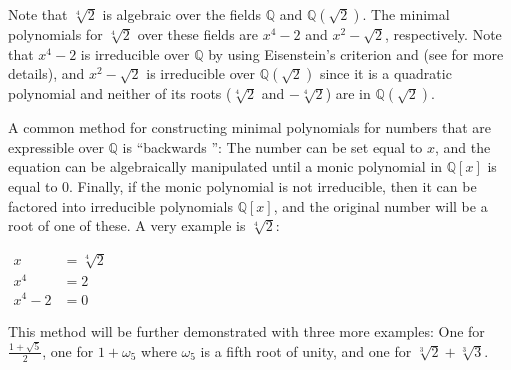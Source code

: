 \documentclass[12pt]{article}
\begin{document}
Note that $\sqrt[4]{2}$ is algebraic over the fields $\mathbb{Q}$ and $\mathbb{Q}(\sqrt{2})$.  The minimal polynomials for $\sqrt[4]{2}$ over these fields are $x^4-2$ and $x^2-\sqrt{2}$, respectively.  Note that $x^4-2$ is irreducible over $\mathbb{Q}$ by using Eisenstein's criterion and  (see  for more details), and $x^2-\sqrt{2}$ is irreducible over $\mathbb{Q}(\sqrt{2})$ since it is a quadratic polynomial and neither of its roots ($\sqrt[4]{2}$ and $-\sqrt[4]{2}$) are in $\mathbb{Q}(\sqrt{2})$.

A common method for constructing minimal polynomials for numbers that are expressible over $\mathbb{Q}$ is ``backwards '':  The number can be set equal to $x$, and the equation can be algebraically manipulated until a monic polynomial in $\mathbb{Q}[x]$ is equal to 0.  Finally, if the monic polynomial is not irreducible, then it can be factored into irreducible polynomials $\mathbb{Q}[x]$, and the original number will be a root of one of these.  A very  example is $\sqrt[4]{2}$:

\begin{center}
$\begin{array}{rl}
x & =\sqrt[4]{2} \\
x^4 & =2 \\
x^4-2 & =0 \end{array}$
\end{center}

This method will be further demonstrated with three more examples:  One for $\displaystyle \frac{1+\sqrt{5}}{2}$, one for $1+\omega_5$ where $\omega_5$ is a fifth root of unity, and one for $\sqrt[3]{2}+\sqrt[3]{3}$.
\end{document}
